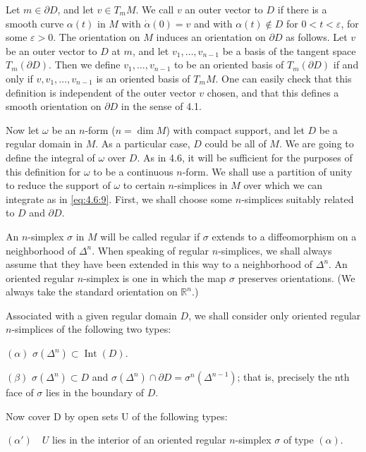 Let $m \in \partial D$, and let $v \in T_{m} M$. We call $v$ an outer vector to $D$ if there is a smooth curve $\alpha(t)$ in $M$ with $\dot{\alpha}(0) = v$ and with $\alpha(t) \notin D$ for $0 < t < \varepsilon$, for some $\varepsilon > 0$. The orientation on $M$ induces an orientation on $\partial D$ as follows. Let $v$ be an outer vector to $D$ at $m$, and let $v_1, \ldots, v_{n-1}$ be a basis of the tangent space $T_m(\partial D)$. Then we define $v_1, \ldots, v_{n-1}$ to be an oriented basis of $T_m(\partial D)$ if and only if $v, v_1, \ldots, v_{n-1}$ is an oriented basis of $T_{m} M$. One can easily check that this definition is independent of the outer vector $v$ chosen, and that this defines a smooth orientation on $\partial D$ in the sense of 4.1.

Now let $\omega$ be an $n$-form ($n = \dim M$) with compact support, and let $D$ be a regular domain in $M$. As a particular case, $D$ could be all of $M$. We are going to define the integral of $\omega$ over $D$. As in 4.6, it will be sufficient for the purposes of this definition for $\omega$ to be a continuous $n$-form. We shall use a partition of unity to reduce the support of $\omega$ to certain $n$-simplices in $M$ over which we can integrate as in \eqref{eq:4.6:9}. First, we shall choose some $n$-simplices suitably related to $D$ and $\partial D$.

An $n$-simplex $\sigma$ in $M$ will be called regular if $\sigma$ extends to a diffeomorphism on a neighborhood of $\Delta^n$. When speaking of regular $n$-simplices, we shall always assume that they have been extended in this way to a neighborhood of $\Delta^n$. An oriented regular $n$-simplex is one in which the map $\sigma$ preserves orientations. (We always take the standard orientation on $\mathbb{R}^n$.)

Associated with a given regular domain $D$, we shall consider only oriented regular $n$-simplices of the following two types:

$ (\alpha) $  $ \sigma(\Delta^n) \subset \operatorname{Int}(D) $.

$ (\beta) $  $ \sigma(\Delta^n) \subset D $ and  $ \sigma(\Delta^n) \cap \partial D = \sigma^n (\Delta^{n-1}) $; that is, precisely the nth face of  $ \sigma $ lies in the boundary of  $ D $.

Now cover D by open sets U of the following types:

$ (\alpha') \quad U $ lies in the interior of an oriented regular  $ n $-simplex  $ \sigma $ of type  $ (\alpha) $.

